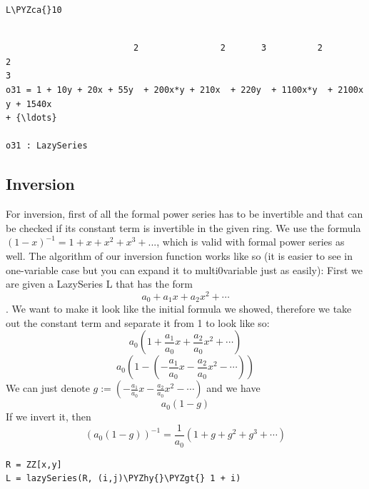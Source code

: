 \documentclass[11pt]{article}
\makeatletter
\def\PYZca{\char`\^}
\def\PYZgt{\char`\>}
\def\PYZhy{\char`\-}
\newcommand{\boxspacing}{\kern\kvtcb@left@rule\kern\kvtcb@boxsep}
\newcommand{\prompt}[4]{
        {\ttfamily\llap{{\color{#2}[#3]:\hspace{3pt}#4}}\vspace{-\baselineskip}}
    }
\makeatother
\begin{document}
    \begin{tcolorbox}[breakable, size=fbox, boxrule=1pt, pad at break*=1mm,colback=cellbackground, colframe=cellborder]
\prompt{In}{incolor}{31}{\boxspacing}
\begin{Verbatim}[commandchars=\\\{\}]
L\PYZca{}10
\end{Verbatim}
\end{tcolorbox}

    \begin{Verbatim}[commandchars=\\\{\}]

                         2                2       3          2        2
3
o31 = 1 + 10y + 20x + 55y  + 200x*y + 210x  + 220y  + 1100x*y  + 2100x y + 1540x
+ {\ldots}

o31 : LazySeries
    \end{Verbatim}

    \hypertarget{inversion}{%
\subsection{Inversion}\label{inversion}}

For inversion, first of all the formal power series has to be invertible
and that can be checked if its constant term is invertible in the given
ring. We use the formula \((1-x)^{-1} = 1+x+x^2+x^3+...\), which is
valid with formal power series as well. The algorithm of our inversion
function works like so (it is easier to see in one-variable case but you
can expand it to multi0variable just as easily): First we are given a
LazySeries L that has the form \[a_0+a_1x+a_2x^2+\cdots\]. We want to
make it look like the initial formula we showed, therefore we take out
the constant term and separate it from 1 to look like so:
\[a_0(1+\frac{a_1}{a_0}x+\frac{a_2}{a_0}x^2 +\cdots)\]
\[a_0(1-(-\frac{a_1}{a_0}x-\frac{a_2}{a_0}x^2 -\cdots))\] We can just
denote \(g := (-\frac{a_1}{a_0}x-\frac{a_2}{a_0}x^2 -\cdots)\) and we
have \[a_0(1-g) \] If we invert it, then
\[(a_0(1-g))^{-1} = \frac{1}{a_0}(1+g+g^2+g^3+\cdots) \]

    \begin{tcolorbox}[breakable, size=fbox, boxrule=1pt, pad at break*=1mm,colback=cellbackground, colframe=cellborder]
\prompt{In}{incolor}{33}{\boxspacing}
\begin{Verbatim}[commandchars=\\\{\}]
R = ZZ[x,y]
L = lazySeries(R, (i,j)\PYZhy{}\PYZgt{} 1 + i)
\end{Verbatim}
\end{tcolorbox}
\end{document}
